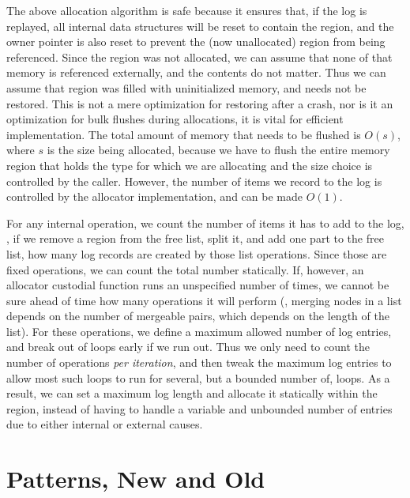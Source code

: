 The above allocation algorithm is safe because it ensures that, if the log is replayed, all internal data structures will
be reset to contain the region, and the owner pointer is also reset to prevent the (now unallocated) region from being
referenced. Since the region was not allocated, we can assume that none of that memory is referenced externally, and the
contents do not matter. Thus we
can assume that region was filled with uninitialized memory, and needs not be restored. This
is not a mere optimization for restoring after a crash, nor is it an optimization for bulk flushes during allocations,
it is vital for efficient implementation. The total amount of memory that needs to be flushed is $O(s)$, where $s$ is
the size being allocated, because we have to flush the entire memory region that holds the type for which we are
allocating and the size choice is controlled by the caller. However, the number of items we record to the log is
controlled by the allocator implementation, and can be made $O(1)$.

For any internal operation, we count the number of items it has to add to the log, \eg, if we remove a region from the
free list, split it, and add one part to the free list, how many log records are created by those list operations.
Since those are fixed operations, we can count the total number statically. If, however, an allocator custodial function
runs an unspecified number of times, we cannot be sure ahead of time how many operations it will perform (\eg, merging
nodes in a list depends on the number of mergeable pairs, which depends on the length of the list). For these
operations, we define a maximum allowed number of log entries, and break out of loops early if we run out. Thus we only
need to count the number of operations \emph{per iteration}, and then tweak the maximum log entries to allow most such
loops to run for several, but a bounded number of, loops. As a result, we can set a maximum log length and allocate it
statically within the region, instead of having to handle a variable and unbounded number of entries due to either
internal or external causes.

\iffalse
    \section{Patterns, New and Old}


